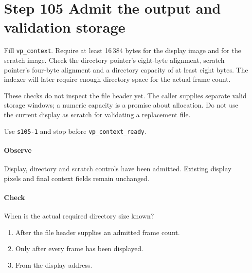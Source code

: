 \section{Step 105 Admit the output and validation storage}
Fill \texttt{vp\_context}. Require at least 16\,384 bytes for the display image and for the scratch image. Check the directory pointer's eight-byte alignment, scratch pointer's four-byte alignment and a directory capacity of at least eight bytes. The indexer will later require enough directory space for the actual frame count.

These checks do not inspect the file header yet. The caller supplies separate valid storage windows; a numeric capacity is a promise about allocation. Do not use the current display as scratch for validating a replacement file.

Use \texttt{s105-1} and stop before \texttt{vp\_context\_ready}.

\paragraph{Observe} Display, directory and scratch controls have been admitted. Existing display pixels and final context fields remain unchanged.

\paragraph{Check} When is the actual required directory size known?
\begin{enumerate}[label=\Alph*.]
  \item After the file header supplies an admitted frame count.
  \item Only after every frame has been displayed.
  \item From the display address.
\end{enumerate}

